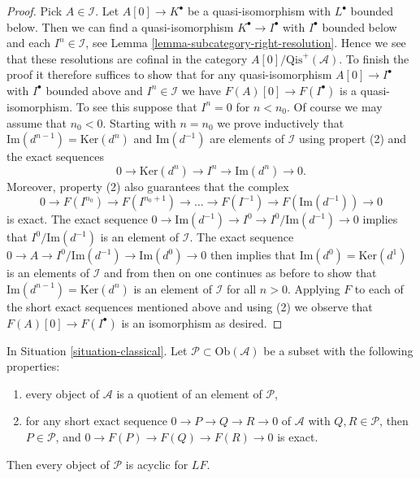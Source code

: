 \begin{proof}
Pick $A \in \mathcal{I}$.
Let $A[0] \to K^\bullet$ be a quasi-isomorphism with $L^\bullet$
bounded below. Then we can find a quasi-isomorphism
$K^\bullet \to I^\bullet$ with $I^\bullet$ bounded below and
each $I^n \in \mathcal{I}$, see
Lemma \ref{lemma-subcategory-right-resolution}.
Hence we see that these resolutions are cofinal in the category
$A[0]/\text{Qis}^{+}(\mathcal{A})$. To finish the proof it therefore
suffices to show that for any quasi-isomorphism
$A[0] \to I^\bullet$ with $I^\bullet$ bounded above and $I^n \in \mathcal{I}$
we have $F(A)[0] \to F(I^\bullet)$ is a quasi-isomorphism.
To see this suppose that $I^n = 0$ for $n < n_0$. Of course we may assume
that $n_0 < 0$. Starting with $n = n_0$ we prove inductively that
$\text{Im}(d^{n - 1}) = \text{Ker}(d^n)$ and $\text{Im}(d^{-1})$
are elements of $\mathcal{I}$ using propert (2) and the exact sequences
$$
0 \to \text{Ker}(d^n) \to I^n \to \text{Im}(d^n) \to 0.
$$
Moreover, property (2) also guarantees that the complex
$$
0 \to F(I^{n_0}) \to F(I^{n_0 + 1}) \to \ldots \to F(I^{-1}) \to
F(\text{Im}(d^{-1})) \to 0
$$
is exact. The exact sequence
$0 \to \text{Im}(d^{-1}) \to I^0 \to I^0/\text{Im}(d^{-1}) \to 0$
implies that $I^0/\text{Im}(d^{-1})$ is an element of $\mathcal{I}$.
The exact sequence $0 \to A \to I^0/\text{Im}(d^{-1}) \to \text{Im}(d^0) \to 0$
then implies that $\text{Im}(d^0) = \text{Ker}(d^1)$ is an elements of
$\mathcal{I}$ and from then on one continues as before to show that
$\text{Im}(d^{n - 1}) = \text{Ker}(d^n)$ is an element of $\mathcal{I}$
for all $n > 0$. Applying $F$ to each of the short exact sequences
mentioned above and using (2) we observe that $F(A)[0] \to F(I^\bullet)$
is an isomorphism as desired.
\end{proof}

\begin{lemma}
\label{lemma-subcategory-left-acyclics}
In
Situation \ref{situation-classical}.
Let $\mathcal{P} \subset \text{Ob}(\mathcal{A})$ be a subset with the
following properties:
\begin{enumerate}
\item every object of $\mathcal{A}$ is a quotient of an element of
$\mathcal{P}$,
\item for any short exact sequence $0 \to P \to Q \to R \to 0$ of
$\mathcal{A}$ with $Q, R \in \mathcal{P}$, then $P \in \mathcal{P}$,
and $0 \to F(P) \to F(Q) \to F(R) \to 0$ is exact.
\end{enumerate}
Then every object of $\mathcal{P}$ is acyclic for $LF$.
\end{lemma}

